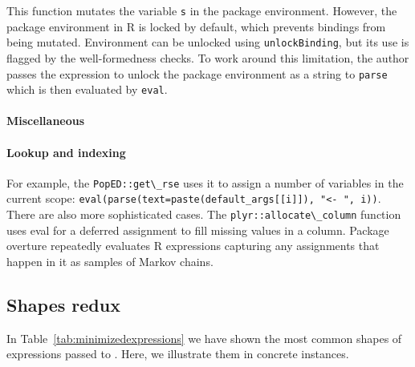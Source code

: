 \documentclass[screen,acmsmall]{acmart}%
\newcommand{\code}[1]{\lstinline |#1|\xspace}
\begin{document}
This function mutates the variable \code{s} in the package environment. However,
the package environment in R is locked by default, which prevents bindings from
being mutated. Environment can be unlocked using \code{unlockBinding}, but its
use is flagged by the well-formedness checks. To work around this limitation,
the author passes the expression to unlock the package environment as a string
to \code{parse} which is then evaluated by \code{eval}.




\paragraph{Miscellaneous}

\paragraph{Lookup and indexing}


For example, the \code{PopED::get\_rse} uses it to
assign a number of variables in the current scope:
\code{eval(parse(text=paste(default_args[[i]]), "<- ", i))}. There are also more
sophisticated cases. The \code{plyr::allocate\_column} function uses eval for a
deferred assignment to fill missing values in a column. Package overture
repeatedly evaluates R expressions capturing any assignments that happen in it
as samples of Markov chains.





\subsection{Shapes redux}

In Table~\ref{tab:minimizedexpressions} we have shown the most common shapes of
expressions passed to \eval. Here, we illustrate them in concrete instances.
\end{document}
